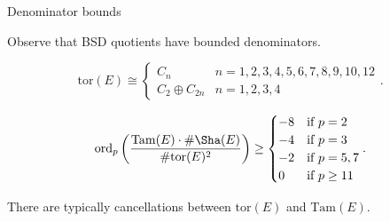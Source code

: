\documentclass[10pt]{beamer}
\begin{document}
\begin{frame}[t]{Denominator bounds}

Observe that BSD quotients have bounded denominators.

\pause

\vspace{0.5cm}

\begin{theorem}[Mazur]
\vspace{-0.2cm} $$ \mathrm{tor}(E) \cong \begin{cases}
C_n & n = 1, 2, 3, 4, 5, 6, 7, 8, 9, 10, 12 \\
C_2 \oplus C_{2n} & n = 1, 2, 3, 4
\end{cases}. $$
\end{theorem}

\pause

\begin{corollary}
\vspace{-0.3cm} $$ \mathrm{ord}_p\left(\dfrac{\mathrm{Tam}(E) \cdot \#\Sha(E)}{\#\mathrm{tor}(E)^2}\right) \ge \begin{cases}
-8 & \text{if} \ p = 2 \\
-4 & \text{if} \ p = 3 \\
-2 & \text{if} \ p = 5, 7 \\
0 & \text{if} \ p \ge 11
\end{cases}. $$
\end{corollary}

\pause

There are typically cancellations between $ \mathrm{tor}(E) $ and $ \mathrm{Tam}(E) $.

\end{frame}
\end{document}
